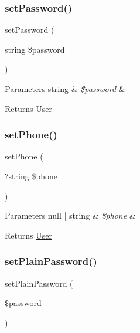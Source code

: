 \subsubsection{\texorpdfstring{setPassword()}{setPassword()}}
{\footnotesize\ttfamily set\+Password (\begin{DoxyParamCaption}\item[{string}]{\$password }\end{DoxyParamCaption})}


\begin{DoxyParams}[1]{Parameters}
string & {\em \$password} & \\
\hline
\end{DoxyParams}
\begin{DoxyReturn}{Returns}
\mbox{\hyperlink{class_app_1_1_entity_1_1_user}{User}} 
\end{DoxyReturn}
\mbox{\label{class_app_1_1_entity_1_1_user_a4ce57d0279a4d18f80513ddacbef0af0}} 
\subsubsection{\texorpdfstring{setPhone()}{setPhone()}}
{\footnotesize\ttfamily set\+Phone (\begin{DoxyParamCaption}\item[{?string}]{\$phone }\end{DoxyParamCaption})}


\begin{DoxyParams}[1]{Parameters}
null | string & {\em \$phone} & \\
\hline
\end{DoxyParams}
\begin{DoxyReturn}{Returns}
\mbox{\hyperlink{class_app_1_1_entity_1_1_user}{User}} 
\end{DoxyReturn}
\mbox{\label{class_app_1_1_entity_1_1_user_ae913df04d7e01f3b547d4dc65f9dffd6}} 
\subsubsection{\texorpdfstring{setPlainPassword()}{setPlainPassword()}}
{\footnotesize\ttfamily set\+Plain\+Password (\begin{DoxyParamCaption}\item[{}]{\$password }\end{DoxyParamCaption})}


